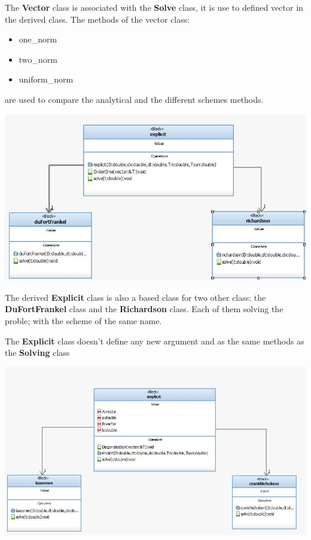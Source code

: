 \documentclass [10 pt, a4 paper]{article}
\begin{document}
\vspace{0.3cm}

The \textbf{Vector} class is associated with the \textbf{Solve} class, it is use to defined 
vector in the derived class.
The methods of the vector class:
\begin{itemize}
    \item one\_norm
    \item two\_norm
    \item uniform\_norm
\end{itemize}
are used to compare the analytical and the different schemes methods.
\begin{center}
    \includegraphics[scale=0.6]{Explicit.JPG}
\end{center}

The derived \textbf{Explicit} class is also a based class for two other class: the \textbf{DuFortFrankel}
class and the \textbf{Richardson} class. Each of them solving the proble; with the scheme of the same name.

\vspace{0.3cm}

The \textbf{Explicit} class doesn't define any new argument and as the same methods as the \textbf{Solving} class
\begin{center}
    \includegraphics[scale=0.6]{Implicit.JPG}
\end{center}
\end{document}
